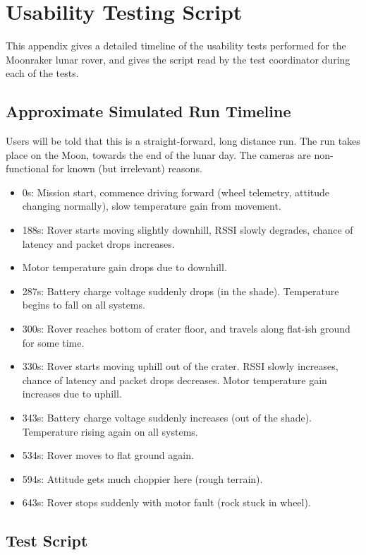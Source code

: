 \chapter{Usability Testing Script}\label{appendix:usability_test}


This appendix gives a detailed timeline of the usability tests performed for the Moonraker lunar rover, and gives the script read by the test coordinator during each of the tests.

\section{Approximate Simulated Run Timeline}

Users will be told that this is a straight-forward, long distance run. The run takes place on the Moon, towards the end of the lunar day. The cameras are non-functional for known (but irrelevant) reasons. 

\begin{itemize}

\item 0s: Mission start, commence driving forward (wheel telemetry, attitude changing normally), slow temperature gain from movement.
\item 188s: Rover starts moving slightly downhill, RSSI slowly degrades, chance of latency and packet drops increases.
\item Motor temperature gain drops due to downhill.
\item 287s: Battery charge voltage suddenly drops (in the shade). Temperature begins to fall on all systems.
\item 300s: Rover reaches bottom of crater floor, and travels along flat-ish ground for some time.
\item 330s: Rover starts moving uphill out of the crater. RSSI slowly increases, chance of latency and packet drops decreases. Motor temperature gain increases due to uphill.
\item 343s: Battery charge voltage suddenly increases (out of the shade). Temperature rising again on all systems.
\item 534s: Rover moves to flat ground again.
\item 594s: Attitude gets much choppier here (rough terrain).
\item 643s: Rover stops suddenly with motor fault (rock stuck in wheel).

\end{itemize}

\section{Test Script}

